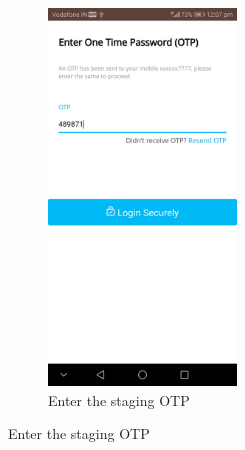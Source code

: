 \documentclass{report}
\begin{document}
\begin{figure}[h!]
\begin{subfigure}[h!]{.3\textwidth}
\includegraphics[width=5cm]{paytm_otp.jpg}
\caption{\centering Enter the staging OTP}
\end{subfigure}


\end{figure}
\end{document}
